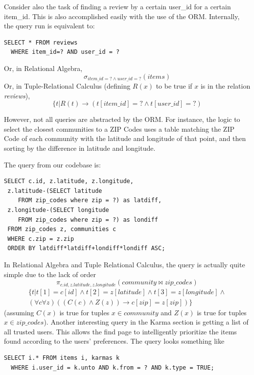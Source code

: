 \documentclass{acm_proc_article-sp}
\begin{document}
Consider also the task of finding a review by a certain user\_id for a certain item\_id. This is also
accomplished easily with the use of the ORM. Internally, the query run is equivalent to:
\begin{lstlisting}
SELECT * FROM reviews 
  WHERE item_id=? AND user_id = ?
\end{lstlisting}
Or, in Relational Algebra,
\[ \sigma_{item\_id=? \land user\_id=?}(\textit{items}) \]
Or, in Tuple-Relational Calculus (defining $R(x)$ to be true if $x$ is in the relation \textit{reviews}),
\[ \{ t | R(t) \to (t[item\_id]=? \land t[user\_id]=?) \]

However, not all queries are abstracted by the ORM. For instance, the logic to select the closest
communities to a ZIP Codes uses a table matching the ZIP Code of each community with the latitude and
longitude of that point, and then sorting by the difference in latitude and longitude.

The query from our codebase is:
\begin{lstlisting}
SELECT c.id, z.latitude, z.longitude, 
 z.latitude-(SELECT latitude 
    FROM zip_codes where zip = ?) as latdiff, 
 z.longitude-(SELECT longitude 
    FROM zip_codes where zip = ?) as londiff 
 FROM zip_codes z, communities c 
 WHERE c.zip = z.zip 
 ORDER BY latdiff*latdiff+londiff*londiff ASC;
\end{lstlisting}

In Relational Algebra and Tuple Relational Calculus, the query is actually quite simple due to the lack of order
\[ \pi_{c.id,z.latitude,z.longitude}(\textit{community}\bowtie\textit{zip\_codes}) \]
\[ 
\begin{split}\{ t | t[1] = c[id] \land t[2] = z[latitude] \land t[3] = z[longitude] \land \\
(\forall c\forall z)((C(c) \land Z(z)) \to c[zip] = z[zip])
\}
\end{split}
\]
(assuming $C(x)$ is true for tuples $x \in \textit{community}$ and $Z(x)$ is true for tuples $x \in \textit{zip\_codes}$).
Another interesting query in the Karma section is getting a list of all trusted users. This allows the find page
to intelligently prioritize the items found according to the users' preferences. The query looks something like
\begin{lstlisting}
SELECT i.* FROM items i, karmas k 
  WHERE i.user_id = k.unto AND k.from = ? AND k.type = TRUE;
\end{lstlisting}
\end{document}
